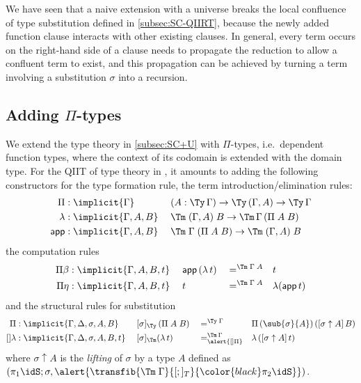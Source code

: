 \documentclass[a4paper,UKenglish,numberwithinsect,cleveref,thm-restate]{lipics-v2021}
\begin{document}
\begin{remark}
We have seen that a naive extension with a universe breaks the local confluence of type substitution defined in \cref{subsec:SC-QIIRT}, because the newly added function clause interacts with other existing clauses.
In general, every term occurs on the right-hand side of a clause needs to propagate the reduction to allow a confluent term to exist, and this propagation can be achieved by turning a term involving a substitution $\sigma$ into a recursion.
\end{remark}

\subsection{Adding \texorpdfstring{$\Pi$}{Π}-types} \label{subsec:SC+U+Pi}

We extend the type theory in \cref{subsec:SC+U} with $\Pi$-types, i.e.\ dependent function types, where the context of its codomain is extended with the domain type.
For the QIIT of type theory in \cite{Altenkirch2016a}, it amounts to adding the following constructors for the type formation rule, the term introduction/elimination rules:
\begin{alignat*}{3}
  \Pi     &: \implicit{\Gamma}           \; && (A : \Ty\,\Gamma) \to \Ty\,(\Gamma, A) \to \Ty\,\Gamma \\
  \lambda &: \implicit{\Gamma, A, B}     \; && \Tm\;(\Gamma, A)\;B \to \Tm\,\Gamma\,(\Pi\;A\;B) \\
  \mathsf{app} &: \implicit{\Gamma, A, B}\; && \Tm\;\Gamma\;(\Pi\;A\;B) \to \Tm\;(\Gamma, A)\;B
\end{alignat*}
the computation rules
\begin{alignat*}{5}
  \Pi\beta           & : \implicit{\Gamma, A, B, t}\; && \mathsf{app}\,(\lambda\,t) && =^{\Tm\;\Gamma\;A} && t \\
  \Pi\eta            & : \implicit{\Gamma, A, B, t}\; && t                          && =^{\Tm\;\Gamma\;A} && \lambda(\mathsf{app}\,t)
\end{alignat*}
and the structural rules for substitution
\begin{alignat}{5}
  []\Pi              & : \implicit{\Gamma, \Delta, \sigma, A, B}\;    && [ \sigma ]_{\Ty}\,(\Pi\;A\;B) && =^{\Ty\;\Gamma} && \Pi\,(\sub{\sigma}{A})\,([\sigma\uparrow A]\,B) \label{eq:def-type-subst-8} \\
  \mathsf{[]\lambda} & : \implicit{\Gamma, \Delta, \sigma, A, B, t}\; && [\sigma]_{\Tm} (\lambda\,t) && =^{\Tm\,\Gamma}_{\alert{[]\Pi}} && \lambda\,([\sigma \uparrow A]\,t) \nonumber
\end{alignat}
where $\sigma \uparrow A$ is the \emph{lifting}  of $\sigma$ by a type $A$ defined as $(\pi_1\idS; \sigma, \alert{\transfib{\Tm\;\Gamma}{[;]_T}{\color{black}\pi_2\idS}})$. 
\end{document}
